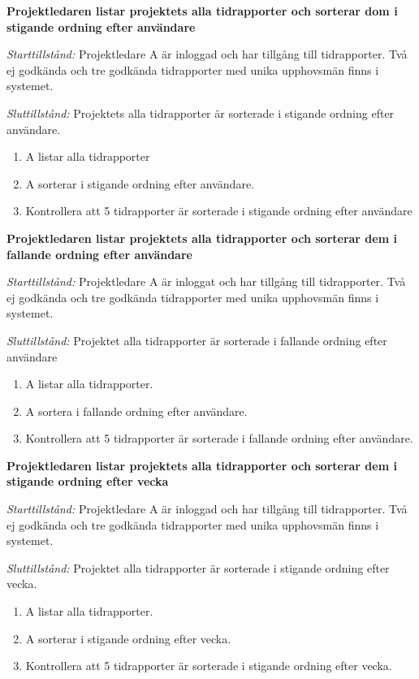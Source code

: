 \documentclass[a4paper]{article}
\begin{document}
\begin{FT}
\item %
\textbf{Projektledaren listar projektets alla tidrapporter och sorterar dom i stigande ordning efter användare}

\emph{Starttillstånd:} Projektledare A är inloggad och har tillgång till tidrapporter. Två ej godkända och tre godkända tidrapporter med unika upphovsmän finns i systemet.

\emph{Sluttillstånd:} Projektets alla tidrapporter är sorterade i stigande ordning efter användare.

\begin{enumerate}
\item A listar alla tidrapporter
\item A sorterar i stigande ordning efter användare.
\item Kontrollera att 5 tidrapporter är sorterade i stigande ordning efter användare
\end{enumerate}

\item %
\textbf{Projektledaren listar projektets alla tidrapporter och sorterar dem i fallande ordning efter användare}

\emph{Starttillstånd:} Projektledare A är inloggat och har tillgång till tidrapporter. Två ej godkända och tre godkända tidrapporter med unika upphovsmän finns i systemet.

\emph{Sluttillstånd:} Projektet alla tidrapporter är sorterade i fallande ordning efter användare

\begin{enumerate}
\item A listar alla tidrapporter.
\item A sortera i fallande ordning efter användare.
\item Kontrollera att 5 tidrapporter är sorterade i fallande ordning efter användare.
\end{enumerate}

\item %
\textbf{Projektledaren listar projektets alla tidrapporter och sorterar dem i stigande ordning efter vecka}

\emph{Starttillstånd:} Projektledare A är inloggad och har tillgång till tidrapporter. Två ej godkända och tre godkända tidrapporter med unika upphovsmän finns i systemet.

\emph{Sluttillstånd:} Projektet alla tidrapporter är sorterade i stigande ordning efter vecka.

\begin{enumerate}
\item A listar alla tidrapporter.
\item A sorterar i stigande ordning efter vecka.
\item Kontrollera att 5 tidrapporter är sorterade i stigande ordning efter vecka.
\end{enumerate}


\end{FT}
\end{document}
